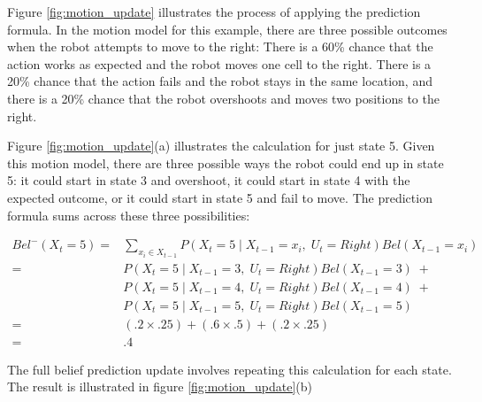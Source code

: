 Figure \ref{fig:motion_update} illustrates the process of applying the
prediction formula. In the motion model for this example, there are
three possible outcomes when the robot attempts to move to the right:
There is a 60\% chance that the action works as expected and the robot
moves one cell to the right.  There is a 20\% chance that the action
fails and the robot stays in the same location, and there is a 20\%
chance that the robot overshoots and moves two positions to the right.

Figure \ref{fig:motion_update}(a) illustrates the calculation for just
state 5. Given this motion model, there are three possible ways the robot could
end up in state 5: it could start in state 3 and overshoot, it could
start in state 4 with the expected outcome, or it could start in state
5 and fail to move.  The prediction formula sums across these three
possibilities:

\begin{align*}
  Bel^{-}(X_t = 5) =& \sum_{x_i \in X_{t-1}} P(X_t = 5 \mid X_{t-1} = x_i,\; U_{t} = Right) Bel(X_{t-1}=x_i)\\
  =& P(X_t = 5 \mid X_{t-1} = 3,\; U_{t} = Right) Bel(X_{t-1}=3)\; +\\
  &P(X_t = 5 \mid X_{t-1} = 4,\; U_{t} = Right) Bel(X_{t-1}=4)\; +\\
  &P(X_t = 5 \mid X_{t-1} = 5,\; U_{t} = Right) Bel(X_{t-1}=5)\\
  =& (.2 \times .25) + (.6 \times .5) + (.2 \times .25)\\
  =& .4
\end{align*}

The full belief prediction update involves repeating this calculation
for each state.  The result is illustrated in figure \ref{fig:motion_update}(b)

